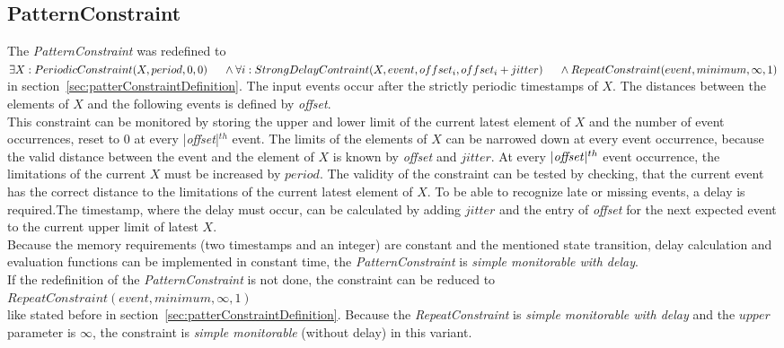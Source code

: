 \subsection{PatternConstraint}
	The \emph{PatternConstraint} was redefined to\\[10pt]
	\begin{math}
		\exists X: PeriodicConstraint(X, period, 0, 0)\\
		\text{\hspace{.5cm}} \land \forall i: StrongDelayContraint(X, event, offset_i, offset_i+jitter)\\
		\text{\hspace{.5cm}} \land RepeatConstraint(event, minimum, \infty, 1)
	\end{math}\\[10pt]
	in section~\ref{sec:patterConstraintDefinition}. The input events occur after the strictly periodic timestamps of $X$. The distances between the elements of $X$ and the following events is defined by \textit{offset}.\\
	This constraint can be monitored by storing the upper and lower limit of the current latest element of $X$ and the number of event occurrences, reset to 0 at every |\emph{offset}|$^{th}$ event. The limits of the elements of $X$ can be narrowed down at every event occurrence, because the valid distance between the event and the element of $X$ is known by \emph{offset} and $jitter$. At every $|\text{\emph{offset}}|^{th}$ event occurrence, the limitations of the current $X$ must be increased by $period$. The validity of the constraint can be tested by checking, that the current event has the correct distance to the limitations of the current latest element of $X$. To be able to recognize late or missing events, a delay is required.The timestamp, where the delay must occur, can be calculated by adding $jitter$ and the entry of \textit{offset} for the next expected event to the current upper limit of latest $X$.\\
	Because the memory requirements (two timestamps and an integer) are constant and the mentioned state transition, delay calculation and evaluation functions can be implemented in constant time, the \emph{PatternConstraint} is \textit{simple monitorable with delay}.\\[10 pt]
	If the redefinition of the \emph{PatternConstraint} is not done, the constraint can be reduced to\\[10pt]
	\begin{math}
		RepeatConstraint(event, minimum, \infty, 1)
	\end{math}\\[10pt]
	like stated before in section~\ref{sec:patterConstraintDefinition}. Because the \textit{RepeatConstraint} is \textit{simple monitorable with delay} and the $upper$ parameter is $\infty$, the constraint is \textit{simple monitorable} (without delay) in this variant.
	
